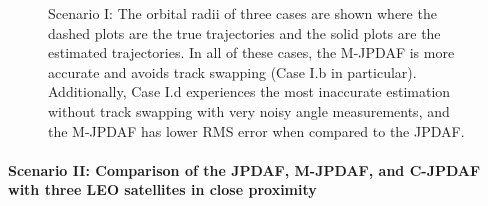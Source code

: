 \begin{figure}
{
\centerline{
	}
\centerline{
	}
}
\caption{Scenario I: The orbital radii of three cases are shown where the dashed plots are the true trajectories and the solid plots are the estimated trajectories.
In all of these cases, the M-JPDAF is more accurate and avoids track swapping (Case I.b in particular).
Additionally, Case I.d experiences the most inaccurate estimation without track swapping with very noisy angle measurements, and the M-JPDAF has lower RMS error when compared to the JPDAF.
}\label{fig:I}
\end{figure}

\newpage

\paragraph*{Scenario II: Comparison of the JPDAF, M-JPDAF, and C-JPDAF with three LEO satellites in close proximity}\ 

